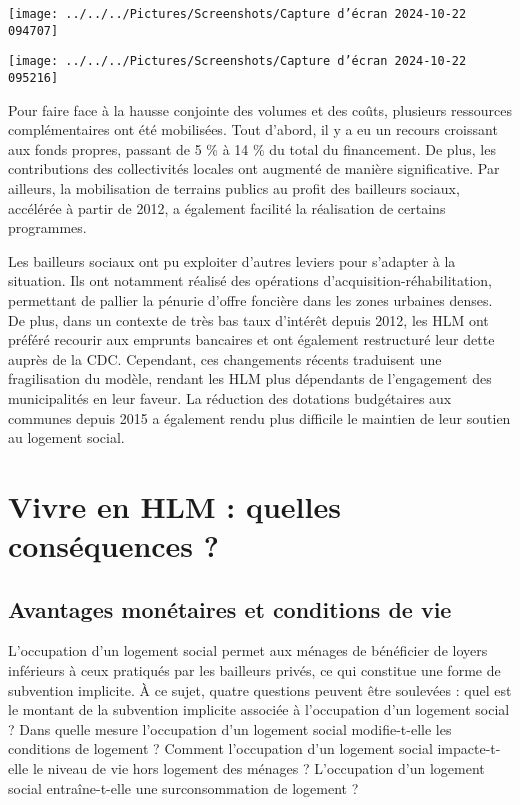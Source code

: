 \documentclass[a4paper, 12pt]{report}
\begin{document}
\begin{center}
	\texttt{[image: ../../../Pictures/Screenshots/Capture d'écran 2024-10-22 094707]}
\end{center}

\begin{center}
	\texttt{[image: ../../../Pictures/Screenshots/Capture d'écran 2024-10-22 095216]}
\end{center}

Pour faire face à la hausse conjointe des volumes et des coûts, plusieurs ressources complémentaires ont été mobilisées. Tout d'abord, il y a eu un recours croissant aux fonds propres, passant de 5 \% à 14 \% du total du financement. De plus, les contributions des collectivités locales ont augmenté de manière significative. Par ailleurs, la mobilisation de terrains publics au profit des bailleurs sociaux, accélérée à partir de 2012, a également facilité la réalisation de certains programmes.

Les bailleurs sociaux ont pu exploiter d'autres leviers pour s'adapter à la situation. Ils ont notamment réalisé des opérations d'acquisition-réhabilitation, permettant de pallier la pénurie d’offre foncière dans les zones urbaines denses. De plus, dans un contexte de très bas taux d’intérêt depuis 2012, les HLM ont préféré recourir aux emprunts bancaires et ont également restructuré leur dette auprès de la CDC. Cependant, ces changements récents traduisent une fragilisation du modèle, rendant les HLM plus dépendants de l’engagement des municipalités en leur faveur. La réduction des dotations budgétaires aux communes depuis 2015 a également rendu plus difficile le maintien de leur soutien au logement social.

\section{Vivre en HLM : quelles conséquences ?}

\subsection{Avantages monétaires et conditions de vie}

L’occupation d’un logement social permet aux ménages de bénéficier de loyers inférieurs à ceux pratiqués par les bailleurs privés, ce qui constitue une forme de subvention implicite. À ce sujet, quatre questions peuvent être soulevées : quel est le montant de la subvention implicite associée à l’occupation d’un logement social ? Dans quelle mesure l’occupation d’un logement social modifie-t-elle les conditions de logement ? Comment l’occupation d’un logement social impacte-t-elle le niveau de vie hors logement des ménages ? L’occupation d’un logement social entraîne-t-elle une surconsommation de logement ? 
\end{document}
